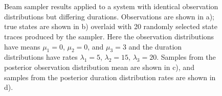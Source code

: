 
\begin{figure}
     \\
     \\
    \caption{Beam sampler results applied to a system with identical observation distributions but differing durations. Observations are shown in a); true states are shown in b) overlaid with 20 randomly selected state traces produced by the sampler. Here the observation distributions have means $\mu_1 = 0$, $\mu_2 = 0$, and $\mu_3 = 3$ and the duration distributions have rates $\lambda_1 = 5$, $\lambda_2 = 15$, $\lambda_3 = 20$. Samples from the posterior observation distribution mean are shown in c), and samples from the posterior duration distribution rates are shown in d).}
    \label{fig:experiment2_results}
\end{figure}
